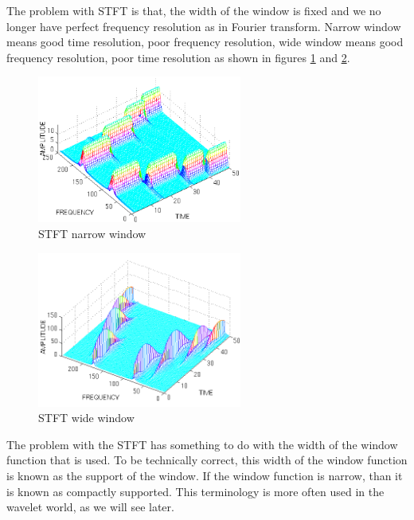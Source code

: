 \documentclass[12pt, a4paper, twoside]{report}
\begin{document}
The problem with STFT is that, the width of the window is fixed and we no longer have perfect frequency resolution as in Fourier transform. 
Narrow window means good time resolution, poor frequency resolution, 
wide window means good frequency resolution, poor time resolution as shown in figures \ref{fig:stft-narrow} and \ref{fig:stft-wide}.
\begin{figure}[!h]
	\centering
	\includegraphics[width=0.6\textwidth]
	{images/chapter3/stft-narrow}
	\caption{STFT narrow window}
	\label{fig:stft-narrow}
\end{figure}
\begin{figure}[!h]
	\centering
	\includegraphics[width=0.6\textwidth]
	{images/chapter3/stft-wide}
	\caption{STFT wide window}
	\label{fig:stft-wide}
\end{figure}

The problem with the STFT has something to do with the width of the window function that is used. To be technically correct, this width of the window function is known as the support of the window. If the window function is narrow, than it is known as compactly supported. This terminology is more often used in the wavelet world, as we will see later.
\end{document}
